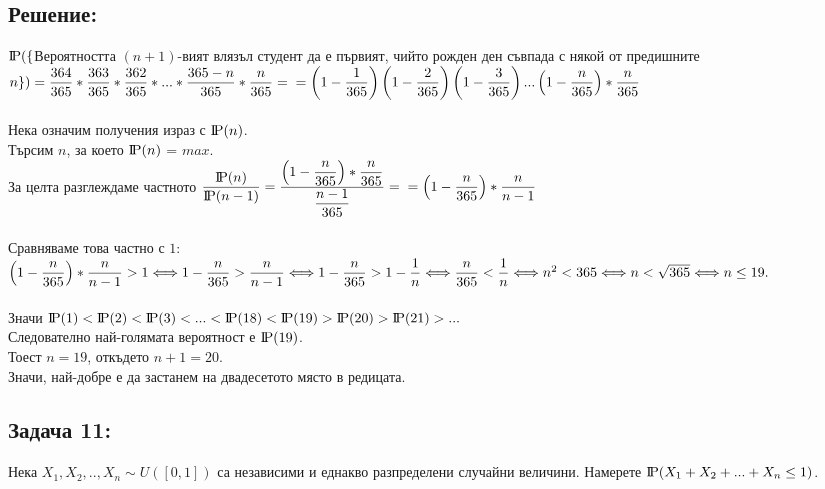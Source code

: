 \documentclass[french]{article}
\newcommand{\probP}{\text{I\kern-0.15em P}}
\begin{document}
	\subsection*{Решение:}
	$\probP(\{$Вероятността $(n + 1)$-вият влязъл студент да е първият, чийто рожден ден съвпада с някой от предишните $n\}) = \dfrac{364}{365}*\dfrac{363}{365}*\dfrac{362}{365}*...*\dfrac{365 - n}{365}*\dfrac{n}{365} = \\ = \left(1 - \dfrac{1}{365}\right)\left(1 - \dfrac{2}{365}\right)\left(1 - \dfrac{3}{365}\right)...\left(1 - \dfrac{n}{365}\right)*\dfrac{n}{365}$ \\
	\\
	Нека означим получения израз с $\probP(n)$. \\
	Търсим $n$, за което $\probP(n)$ = $max$.
	\\
	За целта разглеждаме частното $\dfrac{\probP(n)}{\probP(n-1)} = \dfrac{\left(1 - \dfrac{n}{365}\right)*\dfrac{n}{365}}{\dfrac{n-1}{365}} = \\ = \left(1 - \dfrac{n}{365}\right)*\dfrac{n}{n-1}$ \\
	\\
	Сравняваме това частно с $1$: \\
	$\left(1 - \dfrac{n}{365}\right)*\dfrac{n}{n-1} > 1 \Longleftrightarrow \\
	1 - \dfrac{n}{365} > \dfrac{n}{n-1} \Longleftrightarrow \\
	1 - \dfrac{n}{365} > 1 - \dfrac{1}{n} \Longleftrightarrow \\
	\dfrac{n}{365} < \dfrac{1}{n} \Longleftrightarrow \\
	n^2 < 365 \Longleftrightarrow \\
	n < \sqrt{365} \Longleftrightarrow \\
	n \le 19.$ \\
	\\
	Значи $\probP(1) < \probP(2) < \probP(3) < ... < \probP(18) < \probP(19) > \probP(20) > \probP(21) > ...$ \\
	Следователно най-голямата вероятност е $\probP(19)$. \\
	Тоест $n = 19$, откъдето $n + 1 = 20$. \\
	Значи, най-добре е да застанем на двадесетото място в редицата.
	

	\subsection*{Задача 11:}
	Нека $X_1, X_2, .., X_n \sim U([0,1])$ са независими и еднакво разпределени случайни величини. Намерете $\probP(X_1 + X_2 + ... + X_n \le 1)$.
	
\end{document}
